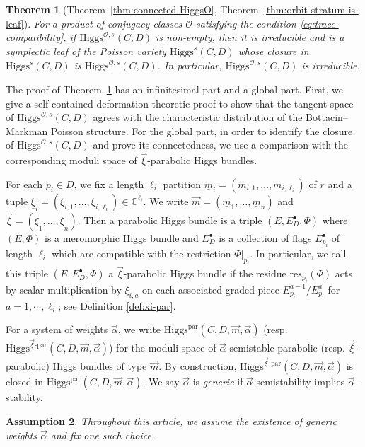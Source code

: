 \documentclass[11pt]{amsart}
\theoremstyle{plain}
\newtheorem{theorem}{Theorem}[section]
\newtheorem{assumption}[theorem]{Assumption}
\theoremstyle{definition}
\theoremstyle{remark}
\newcommand{\C}{\mathbb C}
\newcommand{\ov}[1]{\overline{#1}}
\newcommand{\cO}{\mathcal O}
\newcommand{\Higgs}{\mathrm{Higgs}}
\def\C{\mathbb{C}}
\def\res{\mathrm{res}}
\def\uxi{{\underline{\xi}}}
\def\vxi{\vec{\xi}}
\def\um{{\underline{m}}}
\begin{document}
\begin{theorem}[Theorem~\ref{thm:connected HiggsO}, Theorem~\ref{thm:orbit-stratum-is-leaf}]\label{thm:poisson-closure}
	For a product of conjugacy classes $\cO$ satisfying the condition \eqref{eq:trace-compatibility}, if $\Higgs^{\cO,s}(C,D)$ is non-empty, then it is irreducible and is a symplectic leaf of the Poisson variety $\Higgs^s(C,D)$ whose closure in $\Higgs^{s}(C,D)$ is $\Higgs^{\ov{\cO},s}(C,D)$. In particular, $\Higgs^{\ov{\cO},s}(C,D)$ is irreducible.  
\end{theorem}
The proof of Theorem~\ref{thm:poisson-closure} has an infinitesimal part and a global part. First, we give a self-contained deformation theoretic proof to show that the tangent space of $\Higgs^{\cO, s}(C,D)$ agrees with the characteristic distribution of the Bottacin--Markman Poisson structure. For the global part, in order to identify the closure of $\Higgs^{\cO, s}(C, D)$ and prove its connectedness, we use a comparison with the corresponding moduli space of $\vxi$-parabolic Higgs bundles.

For each $p_i\in D$, we fix a length $\ell_i$ partition $\um_i=(m_{i,1},\dots,m_{i,\ell_i})$ of $r$ and a tuple $\uxi_i=(\xi_{i,1},\dots,\xi_{i,\ell_i})\in \C^{\ell_i}$. We write $\vec m=(\um_1,\dots,\um_n)$ and $\vec\xi=(\uxi_1,\dots,\uxi_n)$. Then a parabolic Higgs bundle is a triple $(E,E_D^\bullet, \Phi)$ where $(E,\Phi)$ is a meromorphic Higgs bundle and $E_D^\bullet$ is a collection of flags $E_{p_i}^\bullet$ of length $\ell_i$ which are compatible with the restriction $\Phi|_{p_i}$. In particular, we call this triple $(E,E_D^\bullet, \Phi)$ a $\vxi$-parabolic Higgs bundle if the residue $\res_{p_i}(\Phi)$ acts by scalar multiplication by $\xi_{i,a}$ on each associated graded piece $E^{a-1}_{p_i}/E^a_{p_i}$ for $a=1, \cdots, \ell_i$; see Definition \ref{def:xi-par}.

For a system of weights $\vec\alpha$, we write $
\Higgs^{\text{par}}(C,D,\vec m,\vec\alpha)$ (resp. $\Higgs^{\vxi\text{-par}}(C,D,\vec m,\vec\alpha)$)
for the moduli space of $\vec{\alpha}$-semistable parabolic (resp. $\vxi$-parabolic) Higgs bundles of type $\vec m$. By construction, $\Higgs^{\vxi\text{-par}}(C,D,\vec m,\vec\alpha)$ is closed in $\Higgs^{\text{par}}(C,D,\vec m,\vec\alpha)$. We say $\vec\alpha$ is \textit{generic} if $\vec\alpha$-semistability implies $\vec\alpha$-stability. 
\begin{assumption}\label{assmp:genericity}
    Throughout this article, we assume the existence of generic weights $\vec\alpha$ and fix one such choice.
\end{assumption}
\end{document}
